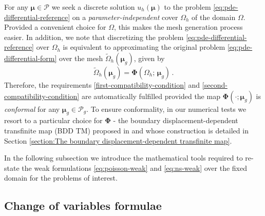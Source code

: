 \documentclass[12pt, a4paper, twoside, openright, notitlepage]{report}
\numberwithin{equation}{chapter}
\theoremstyle{theorem}
\theoremstyle{definition}
\theoremstyle{remark}
\theoremstyle{proposition}
\numberwithin{figure}{chapter}
\newcommand{\wt}[1]{\widetilde{#1}}
\newcommand{\bg}[1]{\boldsymbol{#1}}
\begin{document}
		For any $\bg{\mu} \in \mathcal{P}$ we seek a discrete solution $u_h(\bg{\mu})$ to the problem \eqref{eq:pde-differential-reference} on a \emph{parameter-independent} cover $\Omega_h$ of the domain $\Omega$. Provided a convenient choice for $\Omega$, this makes the mesh generation process easier. In addition, we note that discretizing the problem \eqref{eq:pde-differential-reference} over $\Omega_h$ is equivalent to approximating the original problem \eqref{eq:pde-differential-form} over the mesh $\wt{\Omega}_h(\bg{\mu}_g)$, given by
		\begin{equation*}
			\label{eq:parametrized-map-discrete}
			\wt{\Omega}_h(\bg{\mu}_g) = \bg{\Phi}(\Omega_h; \, \bg{\mu}_g) \, .
		\end{equation*}
		Therefore, the requirements \ref{first-compatibility-condition} and \ref{second-compatibility-condition} are automatically fulfilled provided the map $\bg{\Phi}(\cdot; \bg{\mu}_g)$ is \emph{conformal} for any $\bg{\mu}_g \in \mathcal{P}_g$. To ensure conformality, in our numerical tests we resort to a particular choice for $\bg{\Phi}$ - the boundary displacement-dependent transfinite map (BDD TM) proposed in \cite{JIR14} and whose construction is detailed in Section \ref{section:The boundary displacement-dependent transfinite map}. 
		
		In the following subsection we introduce the mathematical tools required to re-state the weak formulations \eqref{eq:poisson-weak} and \eqref{eq:ns-weak} over the fixed domain for the problems of interest.
		
	\vspace*{0.3cm}
		
	\subsection{Change of variables formulae}
	\label{section:Change of variables formulae}   
	
\end{document}
